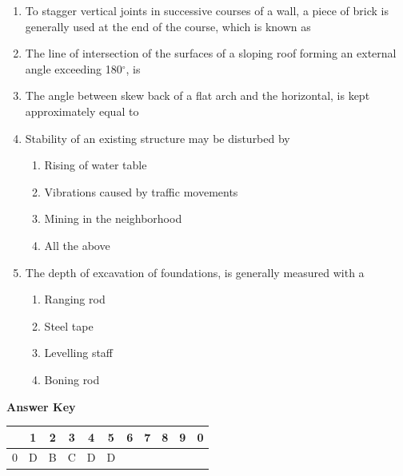 \documentclass[11pt,a4paper]{article}
\begin{document}
\begin{enumerate}
\item{To stagger vertical joints in successive courses of a wall, a piece of brick is generally used at the end of the course, which is known as}
\\
\item{The line of intersection of the surfaces of a sloping roof forming an external angle exceeding 180$^\circ$, is
}
\\
\item{The angle between skew back of a flat arch and the horizontal, is kept approximately equal to}
\\
\item{Stability of an existing structure may be disturbed by}
\begin{enumerate}[label=\Alph*.]
\item{Rising of water table}
\item{Vibrations caused by traffic movements}
\item{Mining in the neighborhood}
\item{All the above}
\end{enumerate}
\item{The depth of excavation of foundations, is generally measured with a}
\begin{enumerate}[label=\Alph*.]
\item{Ranging rod}
\item{Steel tape}
\item{Levelling staff}
\item{Boning rod}
\end{enumerate}
\end{enumerate}
\textbf{Answer Key}
\begin{tabular}{ | c | c c c c c c c c c c | }
\hline
 & 1 & 2 & 3 & 4 & 5 & 6 & 7 & 8 & 9 & 0 \\
\hline
0 & D & B & C & D & D &   &   &   &   &   \\
\hline
\end{tabular}
\clearpage
\end{document}
